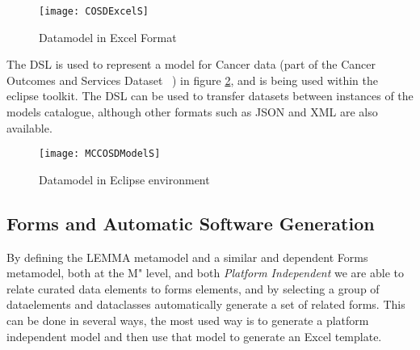 \begin{figure}[here]
	\texttt{[image: COSDExcelS]}
	\caption{ Datamodel in Excel Format} 
	\label{fig:excelCOSD}
\end{figure}
The DSL is used to represent a model for Cancer data (part of the Cancer Outcomes and Services Dataset ~\cite{COSD}) in figure \ref{fig:elmcosd}, and is being used within the eclipse toolkit. The DSL can be used to transfer datasets between instances of the models catalogue, although other formats such as JSON and XML are also available.

\begin{figure}[here]
	\texttt{[image: MCCOSDModelS]}
	\caption{ Datamodel in Eclipse environment} 
	\label{fig:elmcosd}
\end{figure}

\subsection{Forms and Automatic Software Generation}

By defining the LEMMA metamodel and a similar and dependent Forms metamodel, both at the M" level, and both \emph{Platform Independent} we are able to relate curated data elements to forms elements, and by selecting a group of dataelements and dataclasses automatically generate a set of related forms. This can be done in several ways, the most used way is to generate a platform independent model and then use that model to generate an Excel template. 


